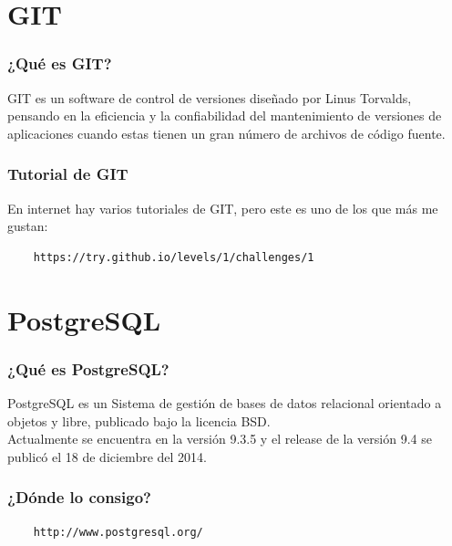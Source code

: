 \documentclass{beamer}
\begin{document}
\section{GIT}

\begin{frame}
  \frametitle{¿Qué es GIT?}
  GIT es un software de control de versiones diseñado por Linus
  Torvalds, pensando en la eficiencia y la confiabilidad del
  mantenimiento de versiones de aplicaciones cuando estas tienen un
  gran número de archivos de código fuente.
\end{frame}

\begin{frame}[fragile]
  \frametitle{Tutorial de GIT}
  En internet hay varios tutoriales de GIT, pero este es uno de los que más me
  gustan:
  \begin{verbatim}
    https://try.github.io/levels/1/challenges/1
  \end{verbatim}
\end{frame}

\section{PostgreSQL}

\begin{frame}
  \frametitle{¿Qué es PostgreSQL?}
  PostgreSQL es un Sistema de gestión de bases de datos relacional orientado a
  objetos y libre, publicado bajo la licencia BSD.\\
  Actualmente se encuentra en la versión 9.3.5 y el release de la versión 9.4
  se publicó el 18 de diciembre del 2014.
\end{frame}

\begin{frame}[fragile]
  \frametitle{¿Dónde lo consigo?}
  \begin{verbatim}
    http://www.postgresql.org/
  \end{verbatim}
\end{frame}
\end{document}
